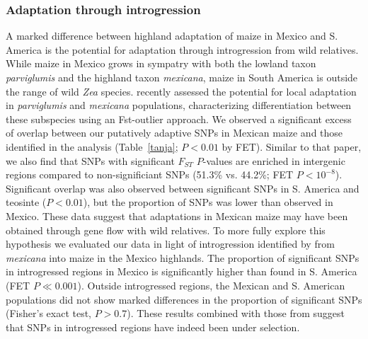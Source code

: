 {{%


\subsubsection{Adaptation through introgression}

A marked difference between highland adaptation of maize in Mexico and S. America is the potential for adaptation through introgression from wild relatives.  While maize in Mexico grows in sympatry with both the lowland taxon \textit{parviglumis} and the highland taxon \textit{mexicana}, maize in South America is outside the range of wild \textit{Zea} species.
 \citep{Pyhajarvi2013} recently assessed the potential for local adaptation in \textit{parviglumis} and \textit{mexicana} populations, characterizing differentiation between these subspecies using an Fst-outlier approach.
We observed a significant excess of overlap between our putatively adaptive SNPs in Mexican maize and those identified in the \citep{Pyhajarvi2013} analysis (Table~\ref{tanja}; $P<0.01$ by FET). Similar to that paper, we also find that SNPs with significant $F_{ST}$ $P$-values are enriched in intergenic regions compared to non-significiant SNPs (51.3\% vs. 44.2\%; FET $P < 10^{-8}$). Significant overlap was also observed between significant SNPs in S. America and teosinte ($P<0.01$), but the proportion of SNPs was lower than observed in Mexico.  These data suggest that adaptations in Mexican maize may have been obtained through gene flow with wild relatives.  To more fully explore this hypothesis we evaluated our data in light of introgression identified by \citep{Profford_2013} from \textit{mexicana} into maize in the Mexico highlands.  
The proportion of significant SNPs in introgressed regions in Mexico is significantly higher than found in S. America (FET $P\ll0.001$).
Outside introgressed regions, the Mexican and S. American populations did not show marked differences in the proportion of significant SNPs (Fisher's exact test, $P>0.7$). These results combined with those from \citep{Profford_2013} suggest that SNPs in introgressed regions have indeed been under selection.  

}}
